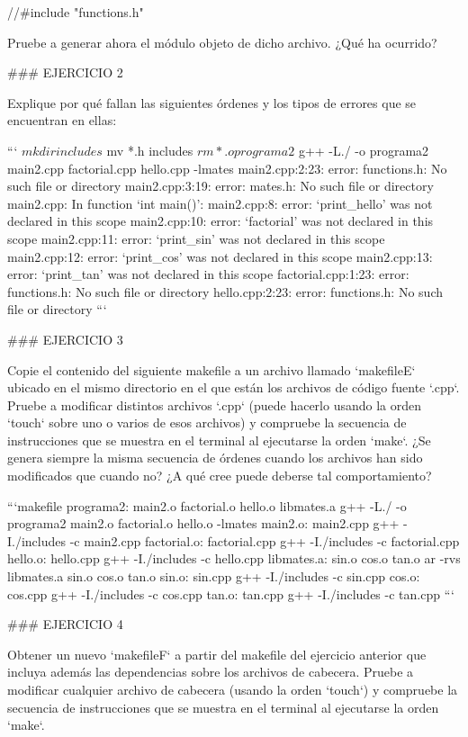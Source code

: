     //#include "functions.h"

Pruebe a generar ahora el módulo objeto de dicho archivo. ¿Qué ha ocurrido?

### EJERCICIO 2

Explique por qué fallan las siguientes órdenes y los tipos de errores que se encuentran en ellas:

```
$ mkdir includes
$ mv *.h includes
$ rm *.o programa2
$ g++ -L./ -o programa2 main2.cpp factorial.cpp hello.cpp -lmates
  main2.cpp:2:23: error: functions.h: No such file or directory
  main2.cpp:3:19: error: mates.h: No such file or directory
  main2.cpp: In function ‘int main()’:
  main2.cpp:8: error: ‘print_hello’ was not declared in this scope
  main2.cpp:10: error: ‘factorial’ was not declared in this scope
  main2.cpp:11: error: ‘print_sin’ was not declared in this scope
  main2.cpp:12: error: ‘print_cos’ was not declared in this scope
  main2.cpp:13: error: ‘print_tan’ was not declared in this scope
  factorial.cpp:1:23: error: functions.h: No such file or directory
  hello.cpp:2:23: error: functions.h: No such file or directory
```

### EJERCICIO 3

Copie el contenido del siguiente  makefile a un archivo llamado `makefileE` ubicado en el mismo directorio en el que están los archivos de código fuente `.cpp`. Pruebe a modificar distintos archivos `.cpp` (puede hacerlo usando la orden `touch` sobre uno o varios de esos archivos) y compruebe la secuencia de instrucciones que se muestra en el terminal al ejecutarse la orden `make`. ¿Se genera siempre la misma secuencia de órdenes cuando los archivos han sido modificados que cuando no? ¿A qué cree puede deberse tal comportamiento?

```makefile
programa2: main2.o factorial.o hello.o libmates.a
	g++ -L./ -o programa2 main2.o factorial.o hello.o -lmates
main2.o: main2.cpp
	g++ -I./includes -c main2.cpp
factorial.o: factorial.cpp
	g++ -I./includes -c factorial.cpp
hello.o: hello.cpp
	g++ -I./includes -c hello.cpp
libmates.a: sin.o cos.o tan.o
	ar -rvs libmates.a sin.o cos.o tan.o
sin.o: sin.cpp
	g++ -I./includes -c sin.cpp
cos.o: cos.cpp
	g++ -I./includes -c cos.cpp
tan.o: tan.cpp
	g++ -I./includes -c tan.cpp
```

### EJERCICIO 4

Obtener un nuevo `makefileF` a partir del makefile del ejercicio anterior que incluya además las dependencias sobre los archivos de cabecera. Pruebe a modificar cualquier archivo de cabecera (usando la orden `touch`) y compruebe la secuencia de instrucciones que se muestra en el terminal al ejecutarse la orden `make`.

